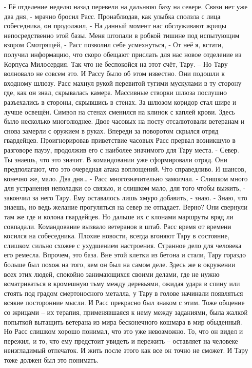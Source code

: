 \documentclass[a4paper, 12pt]{report}
\begin{document}
	- Её отделение неделю назад перевели на дальнюю базу на севере. Связи нет уже два дня, - мрачно бросил Расс. Пронаблюдав, как улыбка сползла с лица собеседника, он продолжил, - На данный момент нас обслуживают жрицы непосредственно этой базы. Меня штопали в робкой тишине под испытующим взором Смотрящей, - Расс позволил себе усмехнуться, - От неё я, кстати, получил информацию, что скоро обещают прислать для нас новое отделение из Корпуса Милосердия. Так что не беспокойся на этот счёт, Тару. –
	Но Тару волновало не совсем это. И Рассу было об этом известно. 
Они подошли к входному шлюзу. Расс махнул рукой перевитой тугими мускулами в ту сторону где, как он знал, скрывалась камера. Массивные створки шлюза послушно разъехались в стороны, скрывшись в стенах.
За шлюзом коридор стал шире и лучше освещён. Символ на стенах сменился на клинок с каплей крови. Здесь было несколько многолюднее. Двое часовых на посту отсалютовали ветеранам и снова замерли с оружием в руках. Впереди за поворотом скрылся отряд гвардейцев. Проигнорировав приветствие часовых Расс прервал возникшую в разговоре паузу, продолжив его с наиболее значимого для Тару места.
- Север. Ты знаешь, что это значит. В командовании уже сформировали отряд. Они предполагают, что это очередная атака воплощений. Что справедливо. И шансов, конечно же, мало. Два дня… - Расс многозначительно замолчал.
 - Слишком много для устранения неполадки со связью, и слишком мало, для того чтобы выжить, - закончил за него Тару. Ему оставалось лишь хмуро добавить, - знаю. 
- Знаю, что знаешь, но ведь желание прогуляться на север не отпадает. Верно?
	Они свернули там же где и колона гвардейцев. Но дальше их с клонами маршруты вряд ли совпадали. Командование вызвало ветеранов в штаб.
Расс время от времени косился на собеседника. Плохие новости, всегда вгоняют Тару в состояние, слишком сильно схожее с ухудшением настроения. Странное дело для человека его ремесла. Впрочем, это база. Вне этой клетки из бетона и стали, Тару гораздо больше был похож на того, кем он был на самом деле. Здесь же в окружении всех этих людей, спокойно занимающихся своими делами, где не нужно всматриваться в кромешную тьму между деревьями, ожидая удара в спину или стоять под градом смертоносного металла, у Тару в голове начинали появляться всякие посторонние мысли. И Расс прекрасно был знаком с этим. Тоже общение со жрицами – их терапия, применявшаяся к нему между заданиями, была жалкой попыткой вытащить ветерана из мира бесконечного кошмара в мир обыденный. Но Расс слишком хорошо понимал, что это уже невозможно. То, что он видел и пережил, и то, что ему предстоит увидеть и пережить – оставляет на человеке неизгладимый отпечаток. И жить после этого как все он точно не сможет. И Тару тоже должен был это понимать.
\end{document}
